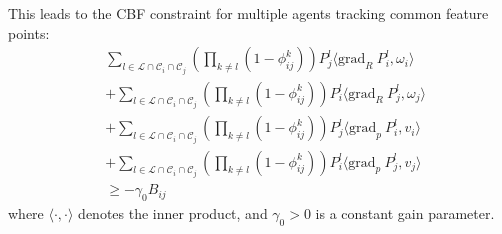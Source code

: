 \documentclass[fleqn,10pt,twocolumn]{SICE_FES25}
\theoremstyle{definition}
\theoremstyle{plain}
\begin{document}
This leads to the CBF constraint for multiple agents tracking common feature points:
\begin{equation}
\begin{aligned}
&\sum_{l \in {\mathcal{L}} \cap {\mathcal{C}}_i \cap {\mathcal{C}}_j}\left(\prod_{k \neq l}(1 - \phi_{ij}^k)\right)P_j^l \langle {\mathrm{grad}}_R\:P_i^l, \omega_i \rangle \\
&+ \sum_{l \in {\mathcal{L}} \cap {\mathcal{C}}_i \cap {\mathcal{C}}_j}\left(\prod_{k \neq l}(1 - \phi_{ij}^k)\right)P_i^l \langle {\mathrm{grad}}_R\:P_j^l, \omega_j \rangle \\
&+ \sum_{l \in {\mathcal{L}} \cap {\mathcal{C}}_i \cap {\mathcal{C}}_j}\left(\prod_{k \neq l}(1 - \phi_{ij}^k)\right)P_j^l \langle {\mathrm{grad}}_p\:P_i^l, v_i \rangle \\
&+ \sum_{l \in {\mathcal{L}} \cap {\mathcal{C}}_i \cap {\mathcal{C}}_j}\left(\prod_{k \neq l}(1 - \phi_{ij}^k)\right)P_i^l \langle {\mathrm{grad}}_p\:P_j^l, v_j \rangle \\
&\geq -\gamma_0 B_{ij}
\label{eq:common_cbf_constraint}
\end{aligned}
\end{equation}
where $\langle \cdot, \cdot \rangle$ denotes the inner product, and $\gamma_0 > 0$ is a constant gain parameter.
\end{document}
